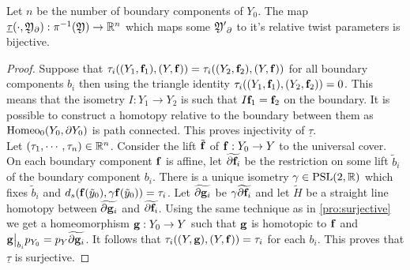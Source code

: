 \begin{proposition}
  Let $n$ be the number of boundary components of $Y_0$. The map $\underline{\tau}(\cdot, \mathfrak{Y}_\partial): \pi^{-1}( \mathfrak{Y}) \to \mathbb{R}^n$ which maps some $ \mathfrak{Y'}_\partial$ to it's relative twist parameters is bijective. 
\end{proposition}
\begin{proof}
  Suppose that $\tau_i((Y_1,\mathbf{f}_1), (Y,\mathbf{f})) = \tau_i((Y_2,\mathbf{f}_2), (Y,\mathbf{f}))$ for all boundary components $b_i$ then using the triangle identity $\tau_i((Y_1,\mathbf{f}_1), (Y_2,\mathbf{f}_2)) = 0$. This means that the isometry $I:Y_1\to Y_2$ is such that $I\mathbf{f}_1 = \mathbf{f}_2$ on the boundary. It is possible to construct a homotopy relative to the boundary between them as $\text{Homeo}_0(Y_0,\partial Y_0)$ is path connected. This proves injectivity of $\underline{\tau}$.\\
  Let $(\tau_1,\cdots,\tau_n)\in \mathbb{R}^n$. Consider the lift $\tilde{\mathbf{f}}$ of $\mathbf{f}:Y_0\to Y$ to the universal cover. On each boundary component $\mathbf{f}$ is affine, let $\widetilde{\partial \mathbf{f}_i}$ be the restriction on some lift $\tilde{b}_i$ of the boundary component $b_i$. There is a unique isometry $\gamma\in \text{PSL}(2,\mathbb{R})$ which fixes $\tilde{b}_i$ and $d_s(\mathbf{f}(\tilde{y}_0), \gamma \mathbf{f}(\tilde{y}_0)) = \tau_i$. Let $\widetilde{\partial \mathbf{g}_i}$ be $\gamma \widetilde{\partial \mathbf{f}_i}$ and let $\tilde{H}$ be a straight line homotopy between $\widetilde{\partial\mathbf{g}_i}$ and $\widetilde{\partial \mathbf{f}_i}$. Using the same technique as in \ref{pro:surjective} we get a homeomorphism $\mathbf{g}:Y_0\to Y$ such that $\mathbf{g}$ is homotopic to $\mathbf{f}$ and $\mathbf{g}\big|_{b_i}p_{Y_0} = p_{Y}\widetilde{\partial \mathbf{g}_i}$. It follows that $\tau_i((Y,\mathbf{g}), (Y,\mathbf{f})) = \tau_i$ for each $b_i$. This proves that $\underline{\tau}$ is surjective.
\end{proof}

